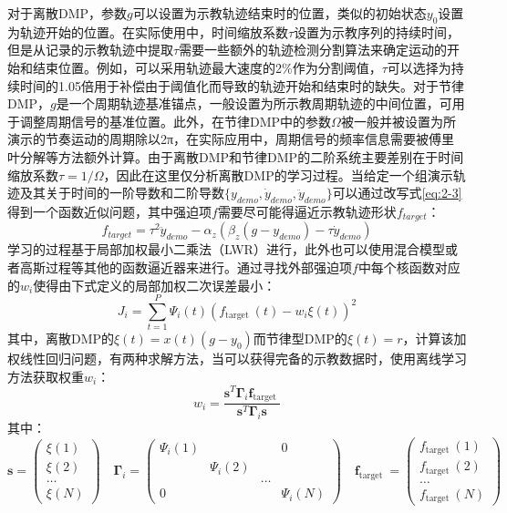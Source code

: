 对于离散DMP，参数$g$可以设置为示教轨迹结束时的位置，类似的初始状态$y_0$设置为轨迹开始的位置。在实际使用中，时间缩放系数$τ$设置为示教序列的持续时间，但是从记录的示教轨迹中提取$τ$需要一些额外的轨迹检测分割算法来确定运动的开始和结束位置\cite{tanApplyingAdaptiveControlb}。例如，可以采用轨迹最大速度的2\%作为分割阈值，$τ$可以选择为持续时间的1.05倍用于补偿由于阈值化而导致的轨迹开始和结束时的缺失。对于节律DMP，$g$是一个周期轨迹基准锚点，一般设置为所示教周期轨迹的中间位置，可用于调整周期信号的基准位置。此外，在节律DMP中的参数$\Omega$被一般并被设置为所演示的节奏运动的周期除以2π，在实际应用中，周期信号的频率信息需要被傅里叶分解等方法额外计算。由于离散DMP和节律DMP的二阶系统主要差别在于时间缩放系数$\tau = 1/\Omega$，因此在这里仅分析离散DMP的学习过程。当给定一个组演示轨迹及其关于时间的一阶导数和二阶导数$\{y_{demo},\dot{y}_{demo},\ddot{y}_{demo} \}$可以通过改写式\ref{eq:2-3}得到一个函数近似问题，其中强迫项$f$需要尽可能得逼近示教轨迹形状$f_{target}$：
\begin{equation}
    f_{target}=\tau^2 \ddot{y}_{demo}-\alpha_z\left(\beta_z\left(g-y_{demo}\right)-\tau \dot{y}_{demo}\right)
    \label{eq:2-13}
\end{equation}
学习的过程基于局部加权最小二乘法（LWR）进行\cite{schaalConstructiveIncrementalLearning1998}，此外也可以使用混合模型或者高斯过程等其他的函数逼近器来进行。通过寻找外部强迫项$f$中每个核函数对应的$w_i$使得由下式定义的局部加权二次误差最小：
\begin{equation}
    J_i=\sum_{t=1}^P \Psi_i(t)\left(f_{\text {target }}(t)-w_i \xi(t)\right)^2
    \label{eq:2-14}
\end{equation}
其中，离散DMP的$ξ(t) = x(t)(g−y_0)$而节律型DMP的$ξ(t) = r$，计算该加权线性回归问题，有两种求解方法，当可以获得完备的示教数据时，使用离线学习方法获取权重$w_i$：
\begin{equation}
    w_i=\frac{\mathbf{s}^T \boldsymbol{\Gamma}_i \mathbf{f}_{\text {target }}}{\mathbf{s}^T \boldsymbol{\Gamma}_i \mathbf{s}}
    \label{eq:2-15}
\end{equation}
其中：
\begin{equation}
    \mathbf{s}=\left(\begin{array}{c}
    \xi(1) \\
    \xi(2) \\
    \ldots \\
    \xi(N)
    \end{array}\right) \quad \boldsymbol{\Gamma}_i=\left(\begin{array}{cccc}
    \Psi_i(1) & & & 0 \\
    & \Psi_i(2) & & \\
    & & \ldots & \\
    0 & & & \Psi_i(N)
    \end{array}\right) \quad \mathbf{f}_{\text {target }}=\left(\begin{array}{c}
    f_{\text {target }}(1) \\
    f_{\text {target }}(2) \\
    \ldots \\
    f_{\text {target }}(N)
    \end{array}\right)
    \label{eq:2-16}
\end{equation}
